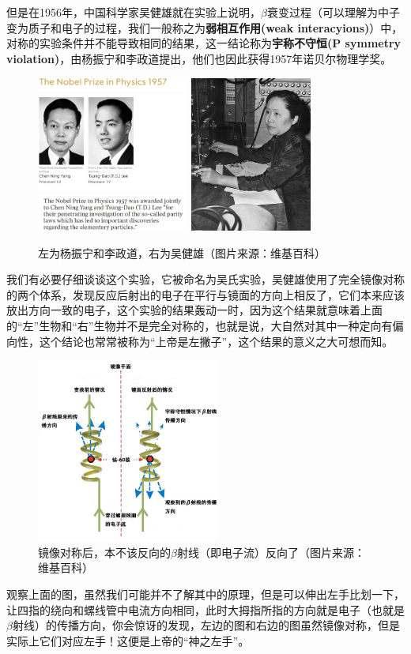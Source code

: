 \documentclass[hyperref,UTF8]{ctexart}
\begin{document}
但是在1956年，中国科学家吴健雄就在实验上说明，$\beta$衰变过程（可以理解为中子变为质子和电子的过程，我们一般称之为\textbf{弱相互作用(weak interacyions)}）中，对称的实验条件并不能导致相同的结果，这一结论称为\textbf{宇称不守恒(P symmetry violation)}，由杨振宁和李政道提出，他们也因此获得1957年诺贝尔物理学奖。
\begin{figure}[H]
    \centering
    \includegraphics[width=5cm]{屏幕截图 2021-10-01 205815.png}
    \includegraphics[width=4cm]{330px-Chien-shiung_Wu_(1912-1997)_C.jpg}
    \caption{左为杨振宁和李政道，右为吴健雄（图片来源：维基百科）}
\end{figure}
我们有必要仔细谈谈这个实验，它被命名为吴氏实验，吴健雄使用了完全镜像对称的两个体系，发现反应后射出的电子在平行与镜面的方向上相反了，它们本来应该放出方向一致的电子，这个实验的结果轰动一时，因为这个结果就意味着上面的“左”生物和“右”生物并不是完全对称的，也就是说，大自然对其中一种定向有偏向性，这个结论也常常被称为“上帝是左撇子”，这个结果的意义之大可想而知。
\begin{figure}[H]
    \centering
    \includegraphics[width=6cm]{Parity_violation_principle_Wu_experiment_(zh-hans).jpg}
    \caption{镜像对称后，本不该反向的$\beta$射线（即电子流）反向了（图片来源：维基百科）}
\end{figure}
观察上面的图，虽然我们可能并不了解其中的原理，但是可以伸出左手比划一下，让四指的绕向和螺线管中电流方向相同，此时大拇指所指的方向就是电子（也就是$\beta$射线）的传播方向，你会惊讶的发现，左边的图和右边的图虽然镜像对称，但是实际上它们对应左手！这便是上帝的“神之左手”。
\end{document}
